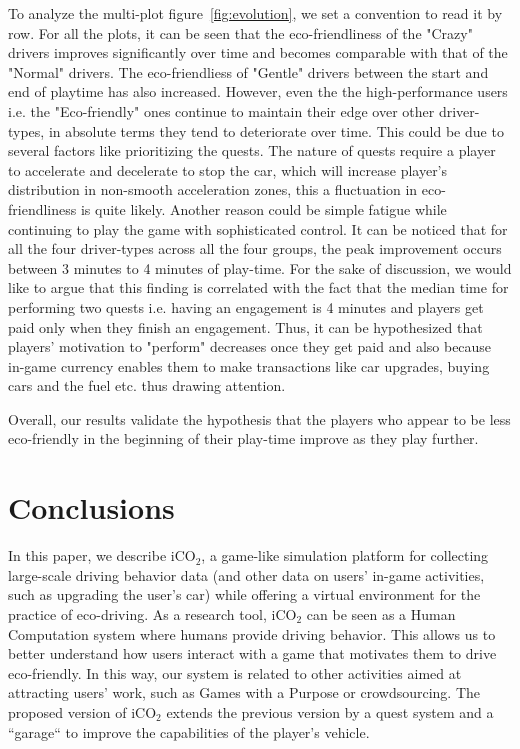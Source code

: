 \documentclass[preprint,authoryear,12pt]{elsarticle}
\begin{document}
To analyze the multi-plot figure~\ref{fig:evolution}, we set a convention to read it by row. For all the plots, it can be seen that the eco-friendliness of the "Crazy" drivers improves significantly over time and becomes comparable with that of the "Normal" drivers. The eco-friendliess of "Gentle" drivers between the start and end of playtime has also increased. However, even the  the high-performance users i.e. the "Eco-friendly" ones continue to maintain their edge over other driver-types, in absolute terms they tend to deteriorate over time. This could be due to several factors like prioritizing the quests. The nature of quests require a player to accelerate and decelerate to stop the car, which will increase player's distribution in non-smooth acceleration zones, this a fluctuation in eco-friendliness is quite likely. Another reason could be simple fatigue while continuing to play the game with sophisticated control. It can be noticed that for all the four driver-types across all the four groups, the peak improvement occurs between 3 minutes to 4 minutes of play-time. For the sake of discussion, we would like to argue that this finding is correlated with the fact that the median time for performing two quests i.e. having an engagement is 4 minutes and players get paid only when they finish an engagement. Thus, it can be hypothesized that players' motivation to "perform" decreases once they get paid and also because in-game currency  enables them to make transactions like car upgrades, buying cars and the fuel etc. thus drawing attention. 

Overall, our results validate the hypothesis that the players who appear to be less eco-friendly in the beginning of their play-time improve as they play further. 



\section{Conclusions} \label{sec:conclusions}

In this paper, we describe iCO$_2$, a game-like simulation platform for collecting large-scale driving behavior data (and other data on users' in-game activities, such as upgrading the user's car) while offering a virtual environment for the practice of eco-driving. As a research tool, iCO$_2$ can be seen as a Human Computation system where humans provide driving behavior. This allows us to better understand how users interact with a game that motivates them to drive eco-friendly. In this way, our system is related to other activities aimed at attracting users' work, such as Games with a Purpose or crowdsourcing. The proposed version of iCO$_2$ extends the previous version \citep{prendingeroliveira2014} by a quest system and a ``garage`` to improve the capabilities of the player's vehicle.
\end{document}
